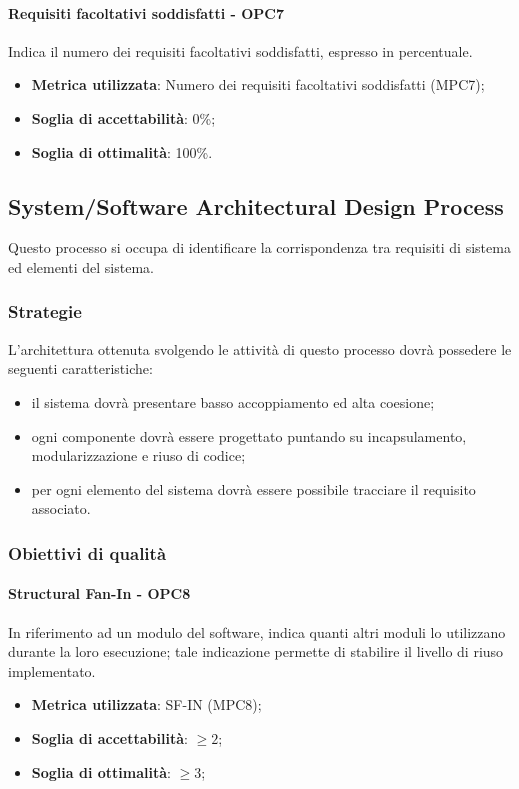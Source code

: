 \documentclass[PdQ.tex]{subfiles}
\begin{document}
			\paragraph{Requisiti facoltativi soddisfatti - OPC7}
			Indica il numero dei requisiti facoltativi soddisfatti, espresso in percentuale.
			\begin{itemize}
					\item \textbf{Metrica utilizzata}: Numero dei requisiti facoltativi soddisfatti (MPC7);
					\item \textbf{Soglia di accettabilità}: 0\%;
					\item \textbf{Soglia di ottimalità}: 100\%.
			\end{itemize}

	\subsection{System/Software Architectural Design Process}
		Questo processo si occupa di identificare la corrispondenza tra requisiti di sistema ed elementi del sistema.

		\subsubsection{Strategie}
		L'architettura ottenuta svolgendo le attività di questo processo dovrà possedere le seguenti caratteristiche:
		\begin{itemize}
		\item il sistema dovrà presentare basso accoppiamento ed alta coesione;
		\item ogni componente dovrà essere progettato puntando su incapsulamento, modularizzazione e riuso di codice;
		\item per ogni elemento del sistema dovrà essere possibile tracciare il requisito associato.
		\end{itemize}

		\subsubsection{Obiettivi di qualità}
			\paragraph{Structural Fan-In - OPC8}
			In riferimento ad un modulo del software, indica quanti altri moduli lo utilizzano durante la
			loro esecuzione; tale indicazione permette di stabilire il livello di riuso implementato.
			\begin{itemize}
					\item \textbf{Metrica utilizzata}: SF-IN (MPC8);
					\item \textbf{Soglia di accettabilità}: \begin{math}\geq 2\end{math};
					\item \textbf{Soglia di ottimalità}: \begin{math}\geq 3\end{math};
			\end{itemize}
\end{document}
